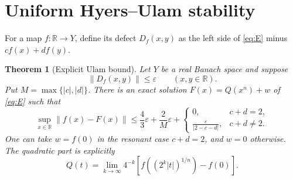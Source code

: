 \documentclass[11pt]{article}
\newtheorem{theorem}{Theorem}
\newcommand{\R}{\mathbb R}
\newcommand{\norm}[1]{\left\lVert#1\right\rVert}
\begin{document}
\section{Uniform Hyers--Ulam stability}

For a map $f:\R\to Y$, define its defect $D_f(x,y)$ as the left side of
\eqref{eq:E} minus $cf(x)+df(y)$.

\begin{theorem}[Explicit Ulam bound]\label{thm:stability}
Let $Y$ be a real Banach space and suppose
\begin{equation}\label{eq:defect}
 \norm{D_f(x,y)}\leq\varepsilon\qquad(x,y\in\R).
\end{equation}
Put $M=\max\{|c|,|d|\}$.  There is an exact solution
$F(x)=Q(x^n)+w$ of \eqref{eq:E} such that
\begin{equation}\label{eq:bound}
 \sup_{x\in\R}\norm{f(x)-F(x)}
 \leq \frac{4}{3}\varepsilon+\frac{2}{M}\varepsilon
 +\begin{cases}
 0,&c+d=2,\\[2pt]
 \displaystyle\frac{\varepsilon}{|2-c-d|},&c+d\ne2.
 \end{cases}
\end{equation}
One can take $w=f(0)$ in the resonant case $c+d=2$, and $w=0$ otherwise.
The quadratic part is explicitly
\begin{equation}\label{eq:limit}
 Q(t)=\lim_{k\to\infty}4^{-k}
 \left[f\!\left((2^k|t|)^{1/n}\right)-f(0)\right].
\end{equation}
\end{theorem}
\end{document}
